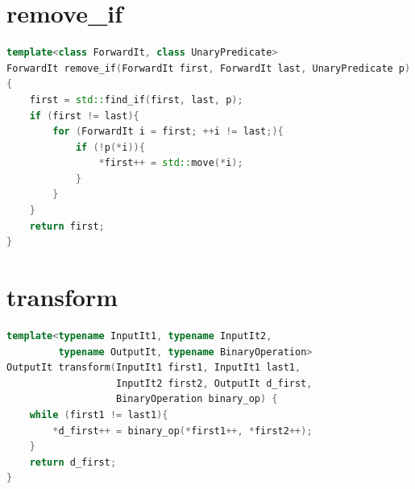 \documentclass[10pt, oneside]{book}
\begin{document}
\section{remove\_if}
\begin{lstlisting}[language=C++]
template<class ForwardIt, class UnaryPredicate>
ForwardIt remove_if(ForwardIt first, ForwardIt last, UnaryPredicate p)
{
    first = std::find_if(first, last, p);
    if (first != last){
        for (ForwardIt i = first; ++i != last;){
            if (!p(*i)){
                *first++ = std::move(*i);
            }
        }
    }
    return first;
}
\end{lstlisting}

\section{transform}
\begin{lstlisting}[language=C++]
template<typename InputIt1, typename InputIt2, 
         typename OutputIt, typename BinaryOperation>
OutputIt transform(InputIt1 first1, InputIt1 last1,
                   InputIt2 first2, OutputIt d_first,
                   BinaryOperation binary_op) {
    while (first1 != last1){
        *d_first++ = binary_op(*first1++, *first2++);
 	}
 	return d_first;
}
\end{lstlisting}
\end{document}
